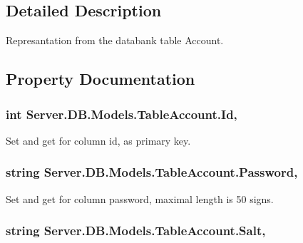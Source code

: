 \subsection{Detailed Description}
Represantation from the databank table Account. 



\subsection{Property Documentation}
\hypertarget{classServer_1_1DB_1_1Models_1_1TableAccount_a2bc49cfaddd688fde3be961d9491bdae}{
\subsubsection[{Id}]{\setlength{\rightskip}{0pt plus 5cm}int Server.\-D\-B.\-Models.\-Table\-Account.\-Id\hspace{0.3cm}{\ttfamily [get]}, {\ttfamily [set]}}}\label{classServer_1_1DB_1_1Models_1_1TableAccount_a2bc49cfaddd688fde3be961d9491bdae}


Set and get for column id, as primary key. 

\hypertarget{classServer_1_1DB_1_1Models_1_1TableAccount_ae2e067ab09522520d715b4cf51386cd9}{
\subsubsection[{Password}]{\setlength{\rightskip}{0pt plus 5cm}string Server.\-D\-B.\-Models.\-Table\-Account.\-Password\hspace{0.3cm}{\ttfamily [get]}, {\ttfamily [set]}}}\label{classServer_1_1DB_1_1Models_1_1TableAccount_ae2e067ab09522520d715b4cf51386cd9}


Set and get for column password, maximal length is 50 signs. 

\hypertarget{classServer_1_1DB_1_1Models_1_1TableAccount_a5d4782aec9c4515ec3158831df9048af}{
\subsubsection[{Salt}]{\setlength{\rightskip}{0pt plus 5cm}string Server.\-D\-B.\-Models.\-Table\-Account.\-Salt\hspace{0.3cm}{\ttfamily [get]}, {\ttfamily [set]}}}\label{classServer_1_1DB_1_1Models_1_1TableAccount_a5d4782aec9c4515ec3158831df9048af}


